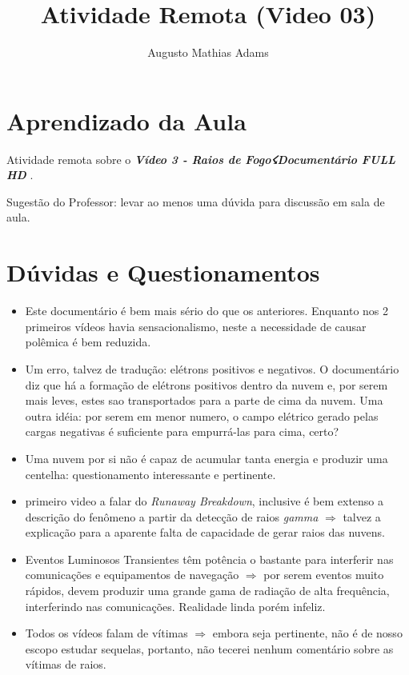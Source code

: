 \documentclass[a4paper, 12pt, onecolumn,singlespacing]{article}
\title{Atividade Remota (Video 03)}
\author[1]{Augusto Mathias Adams}
\affil[1]{augusto.adams@ufpr.br}
\begin{document}
	
	\maketitle
	
	\section{Aprendizado da Aula}
	
	Atividade remota sobre o \textbf{\textit{Vídeo 3 - Raios de Fogo☇Documentário FULL HD }}.
	
	Sugestão do Professor: levar ao menos uma dúvida para discussão em sala de aula.
	
	\section{Dúvidas e Questionamentos}
	
	\begin{itemize}
		\item Este documentário é bem mais sério do que os anteriores. Enquanto nos 2 primeiros vídeos havia sensacionalismo, neste a necessidade de causar polêmica é bem reduzida.
		
		\item Um erro, talvez de tradução: elétrons positivos e negativos. O documentário diz que há a formação de elétrons positivos dentro da nuvem e, por serem mais leves, estes sao transportados para a parte de cima da nuvem. Uma outra idéia: por serem em menor numero, o campo elétrico gerado pelas cargas negativas é suficiente para empurrá-las para cima, certo?
		
		\item Uma nuvem por si não é capaz de acumular tanta energia e produzir uma centelha: questionamento interessante e pertinente.
		
		\item primeiro video a falar do \textit{Runaway Breakdown}, inclusive é bem extenso a descrição do fenômeno a partir da detecção de raios \textit{gamma} $\Rightarrow$ talvez a explicação para a aparente falta de capacidade de gerar raios das nuvens.
		
		\item Eventos Luminosos Transientes têm potência o bastante para interferir nas comunicações e equipamentos de navegação $\Rightarrow$ por serem eventos muito rápidos, devem produzir uma grande gama de radiação de alta frequência, interferindo nas comunicações. Realidade linda porém infeliz.
		
		\item Todos os vídeos falam de vítimas $\Rightarrow$ embora seja pertinente, não é de nosso escopo estudar sequelas, portanto, não tecerei nenhum comentário sobre as vítimas de raios.
		
	\end{itemize}
	
\end{document}
